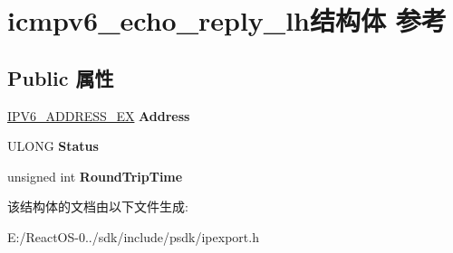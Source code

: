 \hypertarget{structicmpv6__echo__reply__lh}{}\section{icmpv6\+\_\+echo\+\_\+reply\+\_\+lh结构体 参考}
\label{structicmpv6__echo__reply__lh}
\subsection*{Public 属性}
\begin{DoxyCompactItemize}
\item 
\mbox{\label{structicmpv6__echo__reply__lh_a30a3133a5ef5bac7ee444e641359eb47}} 
\hyperlink{struct___i_p_v6___a_d_d_r_e_s_s___e_x}{I\+P\+V6\+\_\+\+A\+D\+D\+R\+E\+S\+S\+\_\+\+EX} {\bfseries Address}
\item 
\mbox{\label{structicmpv6__echo__reply__lh_aadf626cc9d73e1cc82235165ee7eae2f}} 
U\+L\+O\+NG {\bfseries Status}
\item 
\mbox{\label{structicmpv6__echo__reply__lh_aa1320f7ee74e2d6d563ed02786f534ac}} 
unsigned int {\bfseries Round\+Trip\+Time}
\end{DoxyCompactItemize}


该结构体的文档由以下文件生成\+:\begin{DoxyCompactItemize}
\item 
E\+:/\+React\+O\+S-\/0../sdk/include/psdk/ipexport.\+h\end{DoxyCompactItemize}

